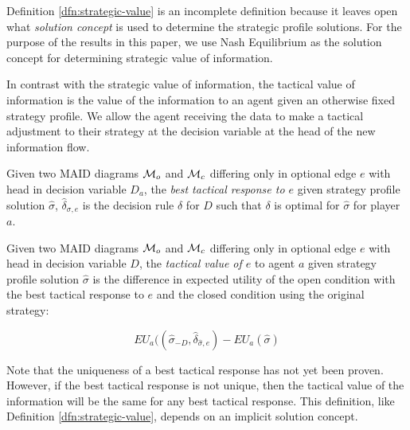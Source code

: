 \documentclass[../thesis.tex]{subfiles}
\begin{document}
Definition \ref{dfn:strategic-value} is an incomplete
definition because it leaves open what \textit{solution concept}
is used to determine the strategic profile solutions.
For the purpose of the results in this paper, we use
Nash Equilibrium as the solution concept for determining
strategic value of information.

In contrast with the strategic value of information,
the tactical value of information is the value of
the information to an agent given an otherwise fixed
strategy profile.
We allow the agent receiving the data to make a tactical
adjustment to their strategy at the decision variable
at the head of the new information flow.

\begin{dfn}
  \label{dfn:best-tactical-response}
  Given two MAID diagrams $\mathcal{M}_{o}$ and $\mathcal{M}_{c}$
  differing only in optional edge $e$ with head in decision
  variable $D_a$,
  the \emph{best tactical response to $e$} given
  strategy profile solution $\hat{\sigma}$, $\hat{\delta}_{\sigma,e}$
  is the decision rule $\delta$ for $D$ such
  that $\delta$ is optimal for $\hat{\sigma}$
  for player $a$.
\end{dfn}

\begin{dfn}
  \label{def:tactical-value}
  Given two MAID diagrams $\mathcal{M}_{o}$ and $\mathcal{M}_{c}$
  differing only in optional edge $e$ with head in decision
  variable $D$,
  the \emph{tactical value of $e$} to agent $a$ given
  strategy profile solution $\hat{\sigma}$
  is the difference in expected utility of
  the open condition with the best tactical response to $e$
  and the closed condition using the original strategy:

  $$EU_a((\hat{\sigma}_{-D},\hat{\delta}_{\hat{\sigma},e}) - EU_a(\hat{\sigma})$$
\end{dfn}


Note that the uniqueness of a best tactical response
has not yet been proven.
However, if the best tactical response is not unique,
then the tactical value of the information will be the
same for any best tactical response.
This definition, like Definition \ref{dfn:strategic-value},
depends on an implicit solution concept.

 
\end{document}
